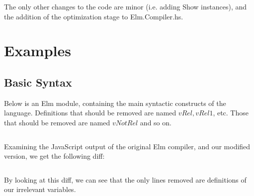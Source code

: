 \documentclass{article}
\begin{document}
The only other changes to the code are minor (i.e. adding Show instances), and the addition of the optimization stage to Elm.Compiler.hs.

\section{Examples}

\subsection{Basic Syntax}

Below is an Elm module, containing the main syntactic constructs of the language.
Definitions that should be removed are named $vRel, vRel1$, etc. Those that should be removed are named
$vNotRel$ and so on.

\inputminted{elm}{apaTests/SyntaxTest.elm}

Examining the JavaScript output of the original Elm compiler, and our modified version,
we get the following diff:


\inputminted{diff}{apaTests/SyntaxTest.diff}

By looking at this diff, we can see that the only lines removed are definitions of our irrelevant variables.          

                    
\end{document}
